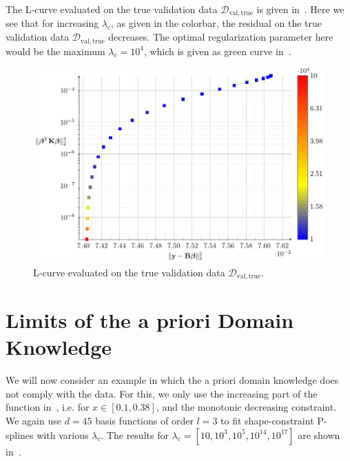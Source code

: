 The L-curve evaluated on the true validation data $\mathcal{D}_{\mathrm{val}, \mathrm{true}}$ is given in~. Here we see that for increasing $\lambda_c$, as given in the colorbar, the residual on the true validation data $\mathcal{D}_{\mathrm{val}, \mathrm{true}}$ decreases. The optimal regularization parameter here would be the maximum $\lambda_c = 10^4$, which is given as green curve in~. 


\begin{figure}[H]
	\centering
	\includegraphics{graphics/pgfplots/cha4/exp_Lcurve_trueBehav.pdf}
	\caption{L-curve evaluated on the true validation data $\mathcal{D}_{\mathrm{val}, \mathrm{true}}$.}
	\label{fig:example-lcurve_true}
\end{figure}


\section{Limits of the a priori Domain Knowledge} \label{sec:limits-of-lambda_c}

We will now consider an example in which the a priori domain knowledge does not comply with the data. For this, we only use the increasing part of the function in~, i.e. for $x \in [0.1, 0.38]$, and the monotonic decreasing constraint. We again use $d=45$ basis functions of order $l=3$ to fit shape-constraint P-splines with various $\lambda_c$. The results for $\lambda_c = [10, 10^3, 10^5, 10^{14}, 10^{17}]$ are shown in~.


